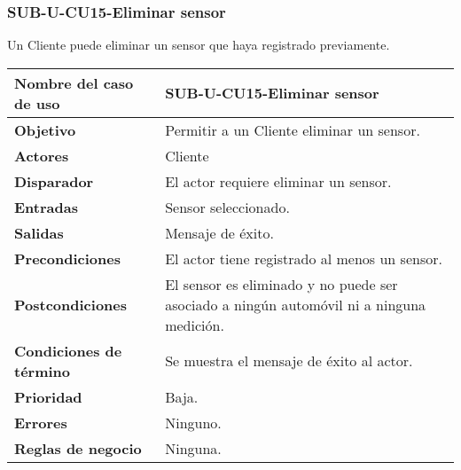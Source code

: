 \subsubsection{SUB-U-CU15-Eliminar sensor}\label{SUB-U-CU15}
Un Cliente puede eliminar un sensor que haya registrado previamente.

\begin{longtable}{|J{5cm}|J{10.3cm}|}
	\hline
	\textbf{Nombre del caso de uso} &
		SUB-U-CU15-Eliminar sensor \\ \hline
	\textbf{Objetivo} &
		Permitir a un Cliente eliminar un sensor. \\ \hline
	\textbf{Actores} &
		Cliente \\ \hline 
	\textbf{Disparador} & 
		El actor requiere eliminar un sensor. \\ \hline 
	\textbf{Entradas} & Sensor seleccionado.
		\\ \hline 
	\textbf{Salidas} & Mensaje de éxito.
		\\ \hline
	\textbf{Precondiciones} & El actor tiene registrado al menos un sensor.
		\\ \hline
	\textbf{Postcondiciones} & El sensor es eliminado y no puede ser asociado a ningún automóvil ni a ninguna medición.
		\\ \hline
	\textbf{Condiciones de término} & Se muestra el mensaje de éxito al actor.
		\\ \hline 
	\textbf{Prioridad} & 
		Baja. \\ \hline
	\textbf{Errores} & Ninguno.
		\\ \hline
	\textbf{Reglas de negocio} & Ninguna.
		 \\ \hline
\end{longtable}

